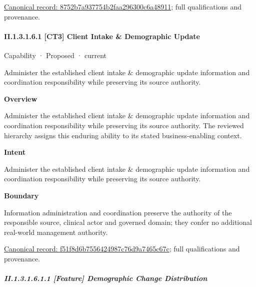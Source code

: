 {\footnotesize \href{../../../../../../../continuum/strategy/capability/8752b7a937754b2faa296300c6a48911.md}{Canonical record: 8752b7a937754b2faa296300c6a48911}; full qualifications and provenance.}\par
\paragraph*{II.1.3.1.6.1 [CT3] Client Intake \& Demographic Update}
\label{navigation:II.1.3.1.6.1}

\label{element:f51f8d6b7556424987c76d9a7465c67c}
{\small Capability · Proposed · current}\par

Administer the established client intake \& demographic update information and coordination responsibility while preserving its source authority.



\textbf{Overview}



Administer the established client intake \& demographic update information and coordination responsibility while preserving its source authority. The reviewed hierarchy assigns this enduring ability to its stated business-enabling context.



\textbf{Intent}



Administer the established client intake \& demographic update information and coordination responsibility while preserving its source authority.



\textbf{Boundary}



Information administration and coordination preserve the authority of the responsible source, clinical actor and governed domain; they confer no additional real-world management authority.


{\footnotesize \href{../../../../../../../continuum/strategy/capability/f51f8d6b7556424987c76d9a7465c67c.md}{Canonical record: f51f8d6b7556424987c76d9a7465c67c}; full qualifications and provenance.}\par
\subparagraph*{II.1.3.1.6.1.1 [Feature] Demographic Change Distribution}
\label{navigation:II.1.3.1.6.1.1}

